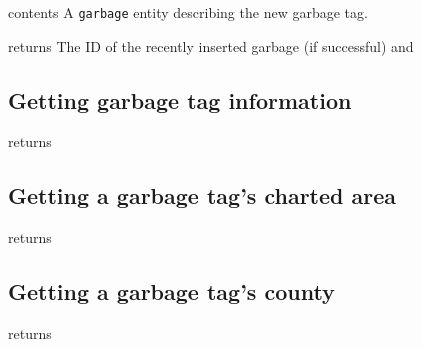 \begin{apidata}{contents}
  A \texttt{garbage} entity describing the new garbage tag.
\end{apidata}
\begin{apidata}{returns}
  The ID of the recently inserted garbage (if successful) and
  \begin{datalist}
  \end{datalist}
\end{apidata}



\subsection{Getting garbage tag information}

\begin{apidata}{returns}
  \begin{datalist}
  \end{datalist}
\end{apidata}

\subsection{Getting a garbage tag's charted area}

\begin{apidata}{returns}
  \begin{datalist}
  \end{datalist}
\end{apidata}

\subsection{Getting a garbage tag's county}

\begin{apidata}{returns}
  \begin{datalist}
  \end{datalist}
\end{apidata}

